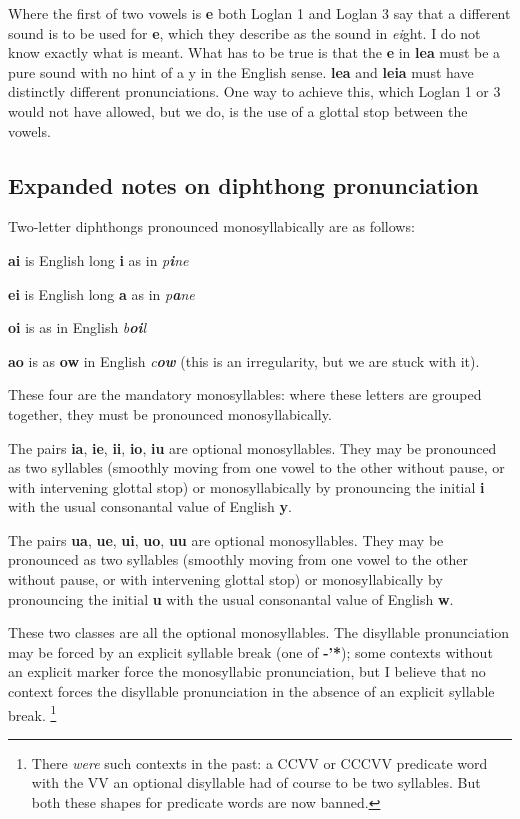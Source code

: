 \documentclass[12pt]{book}
\begin{document}
Where the first of two vowels is {\bf e} both Loglan 1 and Loglan 3 say that a different sound is to be used for {\bf e}, which they describe as the sound in {\em ei\/}ght.  I do not know exactly what is meant.  What has to be true is that the {\bf e} in {\bf lea} must be a pure sound with no hint of a y in the English sense.  {\bf lea} and {\bf leia} must have distinctly different pronunciations.  One way to achieve this, which Loglan 1 or 3 would not have allowed, but we do, is the use of a glottal stop between the vowels.

\subsection{Expanded notes on diphthong pronunciation}

Two-letter diphthongs pronounced monosyllabically are as follows:

{\bf ai} is English long {\bf i} as in {\em p{\bf i}ne\/}

{\bf ei} is English long {\bf a} as in {\em p{\bf a}ne\/}

{\bf oi} is as in English {\em b{\bf oi}l\/}

{\bf ao} is as {\bf ow} in English {\em c{\bf ow}\/}  (this is an irregularity, but we are stuck with it).

These four are the mandatory monosyllables:  where these letters are grouped together, they must be pronounced monosyllabically.

The pairs {\bf ia}, {\bf ie}, {\bf ii}, {\bf io}, {\bf iu} are optional monosyllables.  They may be pronounced as two syllables (smoothly moving from one vowel to the other without pause, or with intervening glottal stop)
or monosyllabically by pronouncing the initial {\bf i} with the usual consonantal value of English {\bf y}.

The pairs {\bf ua}, {\bf ue}, {\bf ui}, {\bf uo}, {\bf uu} are optional monosyllables.  They may be pronounced as two syllables (smoothly moving from one vowel to the other without pause, or with intervening glottal stop)
or monosyllabically by pronouncing the initial {\bf u} with the usual consonantal value of English {\bf w}.

These two classes are all the optional monosyllables.  The disyllable pronunciation may be forced by an explicit syllable break (one of {\bf -'*}); some contexts without an explicit marker force the monosyllabic pronunciation, but I believe that no context forces the disyllable pronunciation in the absence of an explicit syllable break.  \footnote{There {\em were\/} such contexts in the past:  a CCVV or CCCVV predicate word with the VV an optional disyllable had of course to be two syllables.  But both these shapes for predicate words are now banned.}
\end{document}
